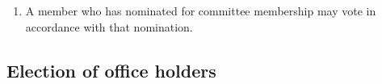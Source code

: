 \documentclass[../constitution.tex]{subfiles}
\begin{document}
\begin{enumerate}
\begin{enumerate}
          \item the number of members nominating for committee membership is greater than the number to be elected; or
          \item the number of members nominating under rule \ref{further-nominations-for-unfilled} is greater than the number of positions remaining unfilled,
        \end{enumerate}

        the members at the meeting must vote by secret ballot to decide the members who are to be elected as committee members.

  \item A member who has nominated for committee membership may vote in accordance with that nomination.
\end{enumerate}

\hypertarget{election-of-office-holders}{%
  \subsection{Election of office holders}\label{election-of-office-holders}}
\end{document}
